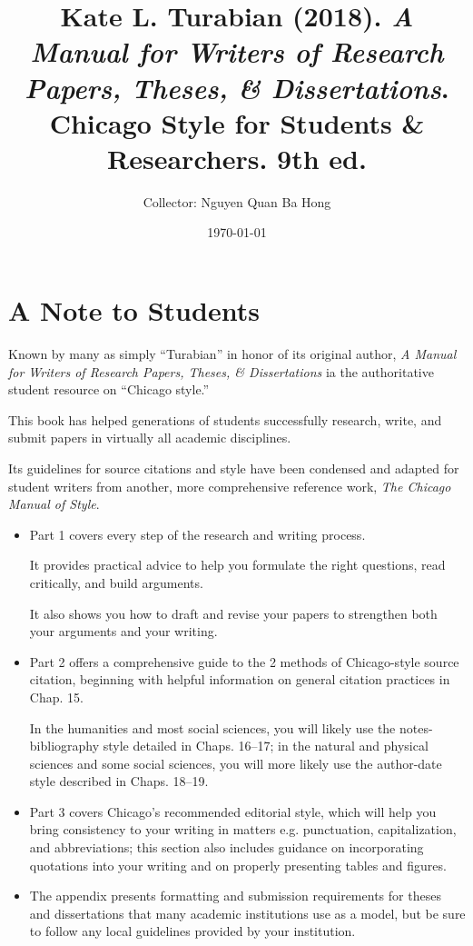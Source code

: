 \documentclass[oneside]{book}
\title{Kate L. Turabian (2018). \textit{A Manual for Writers of Research Papers, Theses, \& Dissertations}. Chicago Style for Students \& Researchers. 9th ed.}
\author{Collector: Nguyen Quan Ba Hong}
\date{\today}
\numberwithin{equation}{section}
\begin{document}
\maketitle
\setcounter{secnumdepth}{6}
\setcounter{tocdepth}{6}
\tableofcontents


\chapter*{A Note to Students}
Known by many as simply ``Turabian'' in honor of its original author, \textit{A Manual for Writers of Research Papers, Theses, \& Dissertations} ia the authoritative student resource on ``Chicago style.''

This book has helped generations of students successfully research, write, and submit papers in virtually all academic disciplines.

Its guidelines for source citations and style have been condensed and adapted for student writers from another, more comprehensive reference work, \textit{The Chicago Manual of Style}.
\begin{itemize}
    \item Part 1 covers every step of the research and writing process.
    
    It provides practical advice to help you formulate the right questions, read critically, and build arguments.
    
    It also shows you how to draft and revise your papers to strengthen both your arguments and your writing.
    \item Part 2 offers a comprehensive guide to the 2 methods of Chicago-style source citation, beginning with helpful information on general citation practices in Chap. 15.
    
    In the humanities and most social sciences, you will likely use the notes-bibliography style detailed in Chaps. 16--17; in the natural and physical sciences and some social sciences, you will more likely use the author-date style described in Chaps. 18--19.
    \item Part 3 covers Chicago's recommended editorial style, which will help you bring consistency to your writing in matters e.g. punctuation, capitalization, and abbreviations; this section also includes guidance on incorporating quotations into your writing and on properly presenting tables and figures.
    \item The appendix presents formatting and submission requirements for theses and dissertations that many academic institutions use as a model, but be sure to follow any local guidelines provided by your institution.
\end{itemize}
\end{document}
